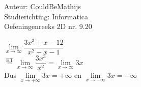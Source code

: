 \documentclass[a4paper]{article}
\newcommand{\llim}{\lim\limits}
\begin{document}
  
\noindent \large Auteur: CouldBeMathijs \\
\noindent \large Studierichting: Informatica\\
\noindent \large Oefeningenreeks 2D nr. 9.20\\

\medskip

\normalsize

$\llim_{x \rightarrow \infty} \dfrac{3x^3+x-12}{x^2-x-1}$\\

$\overset{\mathrm{HT}}{=} \llim_{x \rightarrow \infty} \dfrac{3x^3}{x^2} = \llim_{x \rightarrow \infty} 3x$\\

Dus $\llim_{x \rightarrow + \infty} 3x = + \infty$ en $\llim_{x \rightarrow - \infty} 3x = - \infty$

\begin{thebibliography}{999}
\end{thebibliography}
\end{document}
